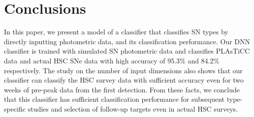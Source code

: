 \documentclass[proof]{pasj01}
\begin{document}
\section{Conclusions}
%
In this paper, we present a model of a classifier that classifies SN types by directly inputting photometric data, and its classification performance.
Our DNN classifier is trained with simulated SN photometric data and classifies PLAsTiCC data and actual HSC SNe data with high accuracy of 95.3\% and 84.2\% respectively.
The study on the number of input dimensions also shows that our classifier can classify the HSC survey data with sufficient accuracy even for two weeks of pre-peak data from the first detection.
From these facts, we conclude that this classifier has sufficient classification performance for subsequent type-specific studies and selection of follow-up targets even in actual HSC surveys.
%
\end{document}
